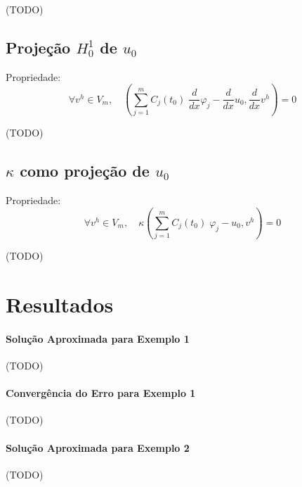 \documentclass[a4paper]{article}
\newcommand{\vphi}{\varphi}
\begin{document}
(TODO)

\subsection{Projeção \texorpdfstring{\(H^1_0\)}{H10} de \texorpdfstring{\(u_0\)}{u0}}

Propriedade:
\[
    \forall v^h \in V_m, \quad
    (\sum_{j=1}^m{ C_j(t_0) \; \frac{d}{dx}\vphi_j } - \frac{d}{dx}u_0, \frac{d}{dx}v^h) = 0
\]

(TODO)

\subsection{\texorpdfstring{\(\kappa\)}{Kappa} como projeção de \texorpdfstring{\(u_0\)}{u0}}

Propriedade:
\[
    \forall v^h \in V_m, \quad
    \kappa(\sum_{j=1}^m{ C_j(t_0) \; \vphi_j } - u_0, v^h) = 0
\]

(TODO)

\newpage
\section{Resultados}

\paragraph{Solução Aproximada para Exemplo 1}

(TODO)

\paragraph{Convergência do Erro para Exemplo 1}

(TODO)

\paragraph{Solução Aproximada para Exemplo 2}

(TODO)
\end{document}
